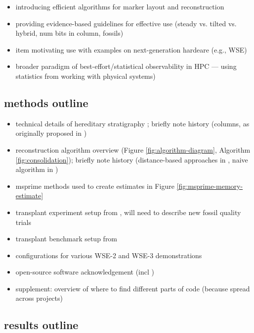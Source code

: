 \begin{itemize}
\begin{itemize}
   \item introducing efficient algorithms for marker layout and reconstruction
   \item providing evidence-based guidelines for effective use (steady vs. tilted vs. hybrid, num bits in column, fossils)
   \item item motivating use with examples on next-generation hardeare (e.g., WSE)
   \item broader paradigm of best-effort/statistical observability in HPC --- using statistics from working with physical systems)
   \end{itemize}
\end{itemize}

\subsection{methods outline}

\begin{itemize}
\item technical details of hereditary stratigraphy \citep{moreno2024algorithms}; briefly note history (columns, as originally proposed in \citep{moreno2022hereditary})
\item reconstruction algorithm overview (Figure \ref{fig:algorithm-diagram}, Algorithm \ref{fig:consolidation}); briefly note history (distance-based approaches in \citep{moreno2022hereditary}, naive algorithm in \citep{moreno2023toward})
\item msprime methods used to create estimates in Figure \ref{fig:msprime-memory-estimate}
\item transplant experiment setup from \citep{moreno2025testing}, will need to describe new fossil quality trials
\item transplant benchmark setup from \citep{singhvi2025scalable}
\item configurations for various WSE-2 and WSE-3 demonstrations
\item open-source software acknowledgement (incl \citep{zanini2025unified})
\item supplement: overview of where to find different parts of code (because spread across projects)
\end{itemize}

\subsection{results outline}

